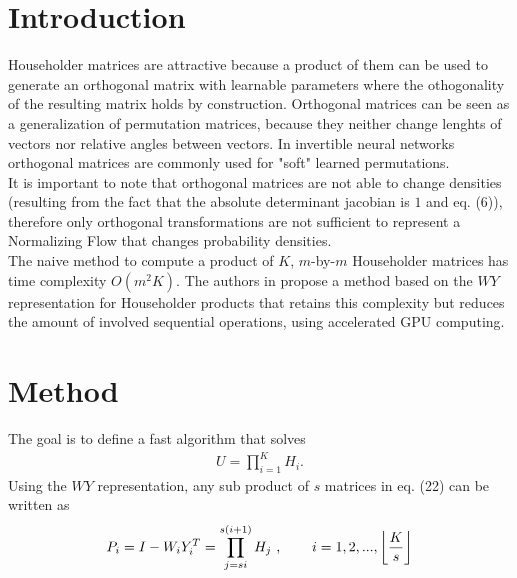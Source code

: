 \documentclass{article}
\DeclarePairedDelimiter\floor{\lfloor}{\rfloor}
\begin{document}
\section{Introduction}
Householder matrices are attractive because a product of them can be used to generate an orthogonal matrix with learnable parameters where the othogonality of the resulting matrix holds by construction. Orthogonal matrices can be seen as a generalization of permutation matrices, because they neither change lenghts of vectors nor relative angles between vectors. In invertible neural networks orthogonal matrices are commonly used for "soft" learned permutations.\\
It is important to note that orthogonal matrices are not able to change densities (resulting from the fact that the absolute determinant jacobian is $1$ and eq. (6)), therefore only orthogonal transformations are not sufficient to represent a Normalizing Flow that changes probability densities.\\
The naive method to compute a product of $K$, $m$-by-$m$ Householder matrices has time complexity $O(m^2K)$. The authors in \cite{fast_hm} propose a method based on the $WY$ representation for Householder products that retains this complexity but reduces the amount of involved sequential operations, using accelerated GPU computing.


\section{Method}\label{sec:meth}
The goal is to define a fast algorithm that solves 
\begin{align}
	U = \prod_{i=1}^KH_i .
\end{align}
Using the $WY$ representation, any sub product of $s$ matrices in eq. (22) can be written as
\begin{align}
	P_i = I - W_iY_i^T = \prod_{j=si}^{s(i+1)}H_j \text{ ,\hspace{8mm}} i=1, 2, ..., \floor*{\frac{K}{s}}
\end{align}
\end{document}
